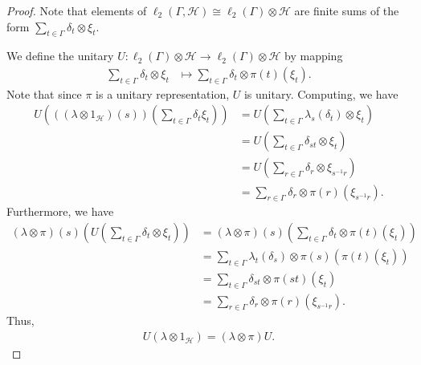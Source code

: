 \documentclass[10pt]{mypackage}
\begin{document}
\begin{proof}
  Note that elements of $\ell_2\left( \Gamma,\mathcal{H} \right)\cong \ell_2\left( \Gamma \right)\otimes \mathcal{H}$ are finite sums of the form $\sum_{t\in\Gamma}\delta_t\otimes \xi_{t}$.\newline

  We define the unitary $U\colon \ell_2\left( \Gamma \right)\otimes \mathcal{H}\rightarrow \ell_2\left( \Gamma \right)\otimes \mathcal{H}$ by mapping
  \begin{align*}
    \sum_{t\in\Gamma}\delta_t\otimes \xi_t &\mapsto \sum_{t\in\Gamma}\delta_t\otimes \pi(t)\left( \xi_t \right).
  \end{align*}
  Note that since $\pi$ is a unitary representation, $U$ is unitary. Computing, we have
  \begin{align*}
    U\left( \left( \left( \lambda\otimes 1_{\mathcal{H}} \right)(s) \right)\left( \sum_{t\in\Gamma}\delta_t\xi_t \right) \right) &= U\left( \sum_{t\in\Gamma}\lambda_s\left( \delta_t \right)\otimes \xi_{t} \right)\\
                                                                                                                                 &= U\left( \sum_{t\in\Gamma}\delta_{st}\otimes \xi_{t} \right)\\
                                                                                                                                 &= U\left( \sum_{r\in\Gamma}\delta_{r}\otimes \xi_{s^{-1}r} \right)\\
                                                                                                                                 &= \sum_{r\in\Gamma}\delta_{r}\otimes \pi(r)\left( \xi_{s^{-1}r} \right).
  \end{align*}
  Furthermore, we have
  \begin{align*}
    \left( \lambda\otimes \pi \right)\left( s \right)\left( U\left( \sum_{t\in\Gamma}\delta_t\otimes \xi_{t} \right) \right) &= \left( \lambda\otimes \pi \right)\left( s \right)\left( \sum_{t\in\Gamma}\delta_t\otimes \pi(t)\left( \xi_t \right) \right)\\
                                                                                                                             &= \sum_{t\in\Gamma}\lambda_t\left( \delta_s \right)\otimes \pi(s)\left( \pi(t)\left( \xi_{t} \right) \right)\\
                                                                                                                             &= \sum_{t\in\Gamma}\delta_{st}\otimes \pi\left( st \right)\left( \xi_{t} \right)\\
                                                                                                                             &= \sum_{r\in\Gamma}\delta_{r}\otimes \pi(r)\left( \xi_{s^{-1}r} \right).
  \end{align*}
  Thus,
  \begin{align*}
    U\left( \lambda\otimes 1_{\mathcal{H}} \right) = \left( \lambda\otimes \pi \right)U.
  \end{align*}
\end{proof}
\end{document}

